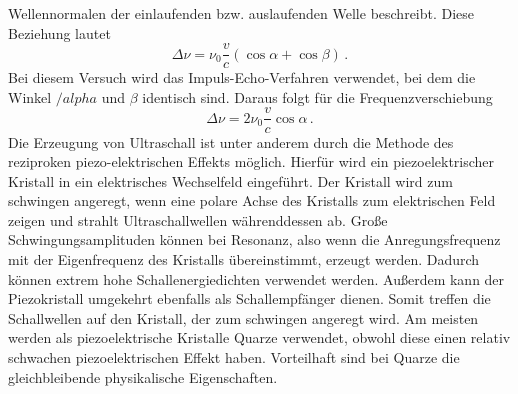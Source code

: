 Wellennormalen der einlaufenden bzw. auslaufenden Welle beschreibt. Diese Beziehung lautet 
\begin{equation}
    \Delta \nu = \nu_0 \frac{v}{c} \left(\cos \alpha + \cos \beta\right)\,.
    \label{eqn:Frequenzverschiebung}
\end{equation}
Bei diesem Versuch wird das Impuls-Echo-Verfahren verwendet, bei dem die Winkel $/alpha$ und $\beta$ identisch sind. Daraus folgt für die
Frequenzverschiebung
\begin{equation}
    \Delta \nu = 2 \nu_0 \frac{v}{c}\cos \alpha \,.
    \label{eqn:Frequenzverschiebung_identisch}
\end{equation}
Die Erzeugung von Ultraschall ist unter anderem durch die Methode des reziproken piezo-elektrischen Effekts möglich. Hierfür wird ein piezoelektrischer Kristall in ein 
elektrisches Wechselfeld eingeführt. Der Kristall wird zum schwingen angeregt, wenn eine polare Achse des Kristalls zum elektrischen Feld zeigen und strahlt Ultraschallwellen währenddessen ab. 
Große Schwingungsamplituden können bei Resonanz, also wenn die Anregungsfrequenz mit der Eigenfrequenz des Kristalls übereinstimmt, erzeugt werden. Dadurch können extrem hohe Schallenergiedichten 
verwendet werden. Außerdem kann der Piezokristall umgekehrt ebenfalls als Schallempfänger dienen. Somit treffen die Schallwellen auf den Kristall, der zum schwingen angeregt wird. Am meisten werden 
als piezoelektrische Kristalle Quarze verwendet, obwohl diese einen relativ schwachen piezoelektrischen Effekt haben. Vorteilhaft sind bei Quarze die gleichbleibende physikalische Eigenschaften. 

